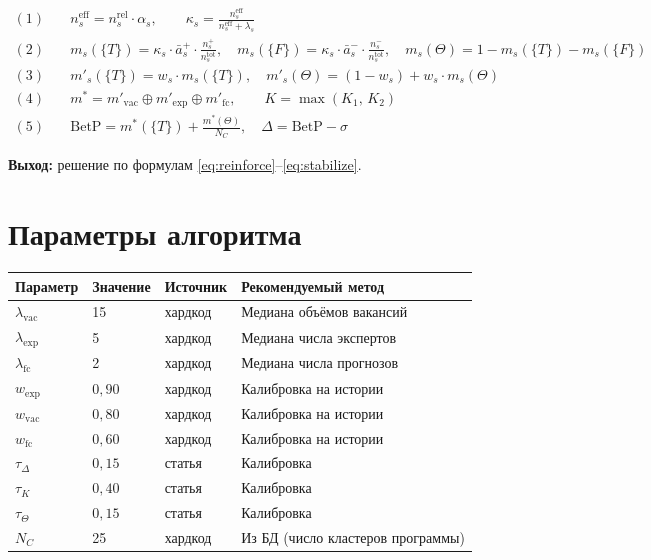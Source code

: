 \documentclass[12pt,a4paper]{article}
\begin{document}
\begin{align*}
  (1)\quad & n_s^{\mathrm{eff}} = n_s^{\mathrm{rel}} \cdot \alpha_s,
             \qquad
             \kappa_s = \frac{n_s^{\mathrm{eff}}}{n_s^{\mathrm{eff}} + \lambda_s} \\[6pt]
  (2)\quad & m_s(\{T\}) = \kappa_s \cdot \bar{a}_s^{+} \cdot
               \frac{n_s^{+}}{n_s^{\mathrm{tot}}},\quad
             m_s(\{F\}) = \kappa_s \cdot \bar{a}_s^{-} \cdot
               \frac{n_s^{-}}{n_s^{\mathrm{tot}}},\quad
             m_s(\Theta) = 1 - m_s(\{T\}) - m_s(\{F\}) \\[6pt]
  (3)\quad & m'_s(\{T\}) = w_s \cdot m_s(\{T\}),\quad
             m'_s(\Theta) = (1-w_s) + w_s \cdot m_s(\Theta) \\[6pt]
  (4)\quad & m^* = m'_{\mathrm{vac}} \oplus m'_{\mathrm{exp}} \oplus m'_{\mathrm{fc}},
             \qquad K = \max(K_1,\, K_2) \\[6pt]
  (5)\quad & \mathrm{BetP} = m^*(\{T\}) + \frac{m^*(\Theta)}{N_C},\quad
             \Delta = \mathrm{BetP} - \sigma
\end{align*}

\noindent\textbf{Выход:} решение по формулам \eqref{eq:reinforce}--\eqref{eq:stabilize}.

\section{Параметры алгоритма}

\begin{center}
\renewcommand{\arraystretch}{1.3}
\begin{tabular}{llll}
\toprule
Параметр & Значение & Источник & Рекомендуемый метод \\
\midrule
$\lambda_{\mathrm{vac}}$ & 15 & хардкод & Медиана объёмов вакансий \\
$\lambda_{\mathrm{exp}}$ & 5  & хардкод & Медиана числа экспертов \\
$\lambda_{\mathrm{fc}}$  & 2  & хардкод & Медиана числа прогнозов \\
$w_{\mathrm{exp}}$  & $0{,}90$ & хардкод & Калибровка на истории \\
$w_{\mathrm{vac}}$  & $0{,}80$ & хардкод & Калибровка на истории \\
$w_{\mathrm{fc}}$   & $0{,}60$ & хардкод & Калибровка на истории \\
$\tau_\Delta$       & $0{,}15$ & статья  & Калибровка \\
$\tau_K$            & $0{,}40$ & статья  & Калибровка \\
$\tau_\Theta$       & $0{,}15$ & статья  & Калибровка \\
$N_C$               & 25       & хардкод & Из БД (число кластеров программы) \\
\bottomrule
\end{tabular}
\end{center}

\end{document}
